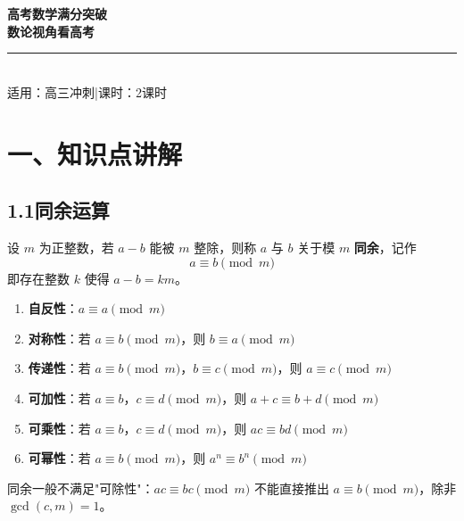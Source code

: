 \documentclass[12pt, a4paper]{ctexart}
\begin{document}
\begin{center}
{\Huge\bfseries\textcolor{mainblue}{高考数学满分突破}}\\[8pt]
{\LARGE\bfseries\textcolor{mainblue}{数论视角看高考}}\\[12pt]
\rule{0.6\textwidth}{1pt}\\[8pt]
{\normalsize 适用：高三冲刺\quad |\quad 课时：2课时}
\end{center}
\vspace{10pt}

\section*{\textcolor{mainblue}{一、知识点讲解}}

\subsection*{1.1\quad 同余运算}

\begin{knowledgebox}[同余的定义]
设 $m$ 为正整数，若 $a - b$ 能被 $m$ 整除，则称 $a$ 与 $b$ 关于模 $m$ \textbf{同余}，记作
\[ a \equiv b \pmod{m} \]
即存在整数 $k$ 使得 $a - b = km$。
\end{knowledgebox}

\begin{tipbox}[同余的基本性质]
\begin{enumerate}[label=(\arabic*)]
  \item \textbf{自反性}：$a \equiv a \pmod{m}$
  \item \textbf{对称性}：若 $a \equiv b \pmod{m}$，则 $b \equiv a \pmod{m}$
  \item \textbf{传递性}：若 $a \equiv b \pmod{m}$，$b \equiv c \pmod{m}$，则 $a \equiv c \pmod{m}$
  \item \textbf{可加性}：若 $a \equiv b$，$c \equiv d \pmod{m}$，则 $a + c \equiv b + d \pmod{m}$
  \item \textbf{可乘性}：若 $a \equiv b$，$c \equiv d \pmod{m}$，则 $ac \equiv bd \pmod{m}$
  \item \textbf{可幂性}：若 $a \equiv b \pmod{m}$，则 $a^n \equiv b^n \pmod{m}$
\end{enumerate}
\end{tipbox}

\begin{warnbox}[易错提醒]
同余一般不满足"可除性"：$ac \equiv bc \pmod{m}$ 不能直接推出 $a \equiv b \pmod{m}$，除非 $\gcd(c, m) = 1$。
\end{warnbox}
\end{document}
